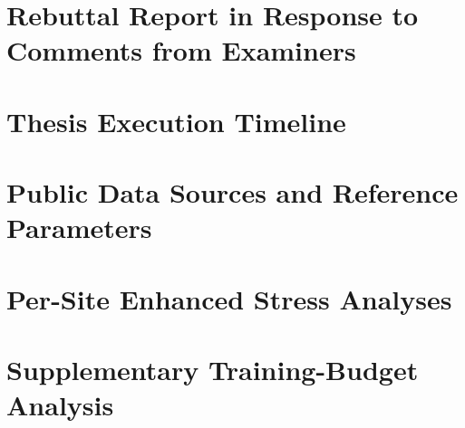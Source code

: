 \documentclass[mtech,smplmath]{iitmdissertation}
\def\revised#1{#1}%
\newif\ifshowrevisions
\DeclareRobustCommand{\revised}[1]{%
  \ifshowrevisions\begingroup\color{P3Rcolor}#1\endgroup\else#1\fi}
\begin{document}
  \prematter
  \printCertificate

  \begin{FrontMatter}
    \printGlossaryAndAbbreviations
  \end{FrontMatter}

  \begin{MainMatter}
    
    
    
        
    
       
    
    

    \appendix
    \clearpage
    \chapter[Rebuttal Report in Response to Examiners]
    {\revised{Rebuttal Report in Response to Comments from Examiners}}
    \label{app:phase3r_rebuttal}
    
    \chapter{Thesis Execution Timeline}
    
    \chapter{Public Data Sources and Reference Parameters}
    
    \chapter{Per-Site Enhanced Stress Analyses}
    \label{app:site_profiles}
      
    \chapter[Supplementary Training-Budget Analysis]
    {\revised{Supplementary Training-Budget Analysis}}
    \label{app:rl_training_budget}
    
  \end{MainMatter}

  \begin{BackMatter}
  \end{BackMatter}
\end{document}
